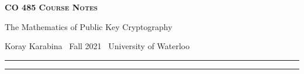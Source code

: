 \documentclass[10pt]{article}
\numberwithin{equation}{section}
\newcommand{\newtitle}[4]{
  \begin{center}
	\huge{\textbf{\textsc{#1 Course Notes}}}
    
	\large{\sc #2}
    
	{\sc #3 \textbullet\, #4 \textbullet\, University of Waterloo}
	\normalsize\vspace{1cm}\hrule
  \end{center}
}
\theoremstyle{newstyle}
\begin{document}
\pagestyle{fancy}
\newtitle{CO 485}{The Mathematics of Public Key Cryptography}{Koray Karabina}{Fall 2021}

\tableofcontents
\vspace{1cm}\hrule
\fancyhead[R]{\nouppercase\rightmark}
\newpage 
{}

\newpage 
\newpage 
\newpage
\newpage 
\newpage 
\newpage 

\printbibliography
\fancyhead[R]{\nouppercase\leftmark}
\end{document}
